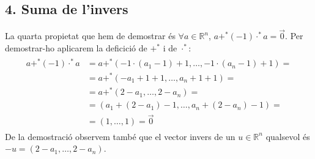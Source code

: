\documentclass[a4paper, 9pt]{article}
\begin{document}
    \subsection*{4. Suma de l'invers}
        La quarta propietat que hem de demostrar \'es ${\forall a \in \mathbb{R}^n}$, ${a +^* (-1)\cdot^*a = \vec{0}}$. Per demostrar-ho aplicarem la deficici\'o de ${+^*}$ i de ${\cdot^*}$:
        \begin{align*}
            \begin{aligned}
                a+^*(-1)\cdot^*a &= a +^* (-1\cdot(a_1-1)+1,\dots,-1\cdot(a_n-1)+1) =\\ 
                                 &= a +^* (-a_1+1+1,\dots,a_n+1+1) =\\ 
                                 &= a +^* (2-a_1,\dots,2-a_n) =\\
                                 &= (a_1+(2-a_1)-1,\dots,a_n+(2-a_n)-1) =\\
                                 &= (1,\dots,1) = \vec{0}
            \end{aligned}
        \end{align*}
        De la demostraci\'o observem tamb\'e que el vector invers de un ${u \in \mathbb{R}^n}$ qualsevol \'es ${-u = (2-a_1,\dots,2-a_n)}$.
\end{document}
